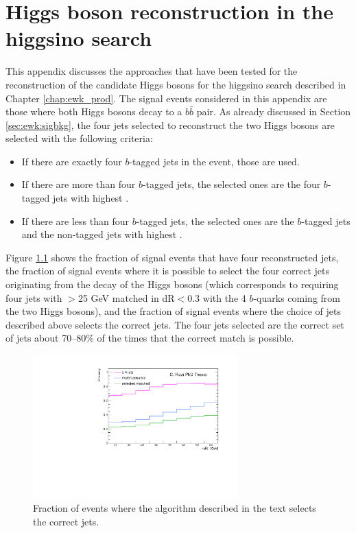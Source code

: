 \chapter{Higgs boson reconstruction in the higgsino search}
\label{app:higgs}

This appendix discusses the approaches that have been tested for the reconstruction of the 
candidate Higgs bosons for the higgsino search described in Chapter \ref{chap:ewk_prod}. 
The signal events considered in this appendix are those where both Higgs bosons decay to a $b\bar{b}$ pair. 
As already discussed in Section \ref{sec:ewk:sigbkg}, the four jets selected to reconstruct the two Higgs bosons 
are selected with the following criteria:

\begin{itemize}
\item If there are exactly four $b$-tagged jets in the event, those are used.
\item If there are more than four $b$-tagged jets, the selected ones are the four $b$-tagged jets with highest \pt.
\item If there are less than four $b$-tagged jets, the selected ones are the $b$-tagged jets and the non-tagged jets with highest \pt.
\end{itemize}

Figure  \ref{fig:h_reco_match_possible}  shows the fraction of signal events that have four reconstructed jets, the fraction 
of signal events where it is possible to select the four correct jets originating from the decay of the Higgs bosons 
(which corresponds to requiring four jets with \pt $>$25 GeV  matched in dR$<$0.3 with the 4 $b$-quarks coming from the two Higgs bosons), 
and the fraction of signal events where the choice of jets described above selects the correct jets. 
The four jets selected are the correct set of jets about 70--80\% of the times that the correct match is possible. 


\begin{figure}[h]
\centering
\includegraphics[width=0.7\textwidth]{figures/h_reco/match_possible.pdf}
\caption{Fraction of events where the algorithm described in the text selects the correct jets.}
\label{fig:h_reco_match_possible}
\end{figure}


